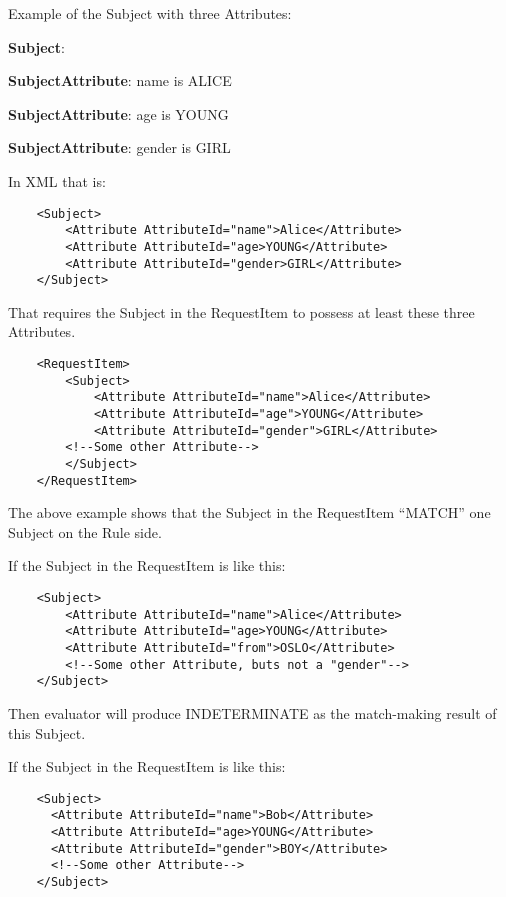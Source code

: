 \documentclass{book}
\begin{document}
Example of the Subject with three Attributes:

    \textbf{Subject}:

    \textbf{SubjectAttribute}: name is ALICE

    \textbf{SubjectAttribute}: age is YOUNG

    \textbf{SubjectAttribute}: gender is GIRL

In XML that is:

\begin{verbatim}
    <Subject>
        <Attribute AttributeId="name">Alice</Attribute>
        <Attribute AttributeId="age>YOUNG</Attribute>
        <Attribute AttributeId="gender>GIRL</Attribute>
    </Subject>
\end{verbatim}

That requires the Subject in the RequestItem to possess at least these three Attributes.

\begin{verbatim}
    <RequestItem>
        <Subject>
            <Attribute AttributeId="name">Alice</Attribute>
            <Attribute AttributeId="age">YOUNG</Attribute>
            <Attribute AttributeId="gender">GIRL</Attribute>
        <!--Some other Attribute-->
        </Subject>
    </RequestItem>
\end{verbatim}

The above example shows that the Subject in the RequestItem ``MATCH'' one Subject on the Rule side.

If the Subject in the RequestItem is like this:

\begin{verbatim}
    <Subject>
        <Attribute AttributeId="name">Alice</Attribute>
        <Attribute AttributeId="age>YOUNG</Attribute>
        <Attribute AttributeId="from">OSLO</Attribute>
        <!--Some other Attribute, buts not a "gender"-->
    </Subject>
\end{verbatim}

Then evaluator will produce INDETERMINATE as the match-making result of this Subject.

If the Subject in the RequestItem is like this:

\begin{verbatim}
    <Subject>
      <Attribute AttributeId="name">Bob</Attribute>
      <Attribute AttributeId="age>YOUNG</Attribute>
      <Attribute AttributeId="gender">BOY</Attribute>
      <!--Some other Attribute-->
    </Subject>
\end{verbatim}
\end{document}
